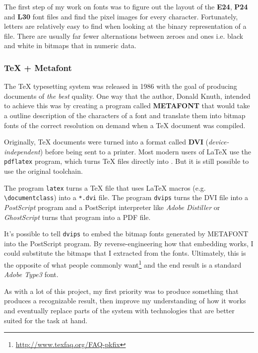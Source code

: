 The first step of my work on \Signum fonts was to figure out the layout of the \textbf{E24}, \textbf{P24} and \textbf{L30} font files and find the pixel images for every character. Fortunately, letters are relatively easy to find when looking at the binary representation of a file. There are usually far fewer alternations between zeroes and ones i.e. black and white in bitmaps that in numeric data.

\subsubsection{TeX + Metafont}

The \TeX{} typesetting system was released in 1986 with the goal of producing documents of \textit{the best} quality. One way that the author, Donald Knuth, intended to achieve this was by creating a program called \textbf{METAFONT} that would take a outline description of the characters of a font and translate them into bitmap fonts of the correct resolution on demand when a \TeX{} document was compiled.

Originally, \TeX{} documents were turned into a format called \textbf{DVI} (\textit{device-independent}) before being sent to a printer. Most modern users of \LaTeX{} use the \texttt{pdflatex} program, which turns \TeX{} files directly into . But it is still possible to use the original toolchain.

The program \texttt{latex} turns a \TeX{} file that uses \LaTeX{} macros (e.g. \texttt{\textbackslash documentclass}) into a \texttt{*.dvi} file. The program \texttt{dvips} turns the DVI file into a \textit{PostScript} program and a PostScript interpreter like \textit{Adobe Distiller} or \textit{GhostScript} turns that program into a PDF file.

It's possible to tell \texttt{dvips} to embed the bitmap fonts generated by METAFONT into the PostScript program. By reverse-engineering how that embedding works, I could substitute the bitmaps that I extracted from the \Signum{} fonts. Ultimately, this is the opposite of what people commonly want\footnote{\url{http://www.texfaq.org/FAQ-pkfix}} and the end result is a standard \textit{Adobe Type3} font.

As with a lot of this project, my first priority was to produce something that produces a recognizable result, then improve my understanding of how it works and eventually replace parts of the system with technologies that are better suited for the task at hand.

